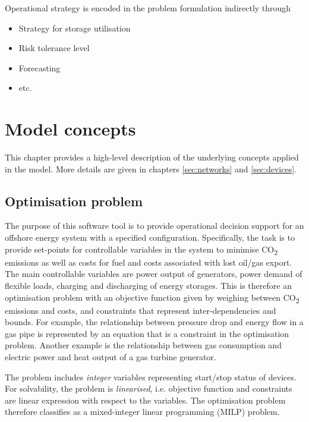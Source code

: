 \documentclass[12pt]{article}
\begin{document}
\noindent
Operational strategy is encoded in the problem formulation indirectly through
\begin{itemize}
	\item Strategy for storage utilisation
	\item Risk tolerance level
	\item Forecasting
	\item etc.
\end{itemize}





\section{Model concepts}

This chapter provides a high-level description of the underlying concepts applied in the model. More details are given in chapters \ref{sec:networks} and \ref{sec:devices}.


\subsection{Optimisation problem}

The purpose of this software tool is to provide operational decision support for an offshore energy system with a specified configuration.  Specifically, the task is to provide set-points for controllable variables in the system to minimise CO\textsubscript{2} emissions as well as costs for fuel and costs associated with lost oil/gas export. 
The main controllable variables are power output of generators, power demand of flexible loads, charging and discharging of energy storages. This is therefore an optimisation problem with an objective function given by weighing between CO\textsubscript{2} emissions and costs, and constraints that represent inter-dependencies and bounds. For example, the relationship between pressure drop and energy flow in a gas pipe is represented by an equation that is a constraint in the optimisation problem. Another example is the relationship between gas consumption and electric power and heat output of a gas turbine generator.

The problem includes \emph{integer} variables representing start/stop status of devices. For solvability, the problem is \emph{linearised}, i.e. objective function and constraints are linear expression with respect to the variables. The optimisation problem therefore classifies as a mixed-integer linear programming (MILP) problem.
\end{document}
